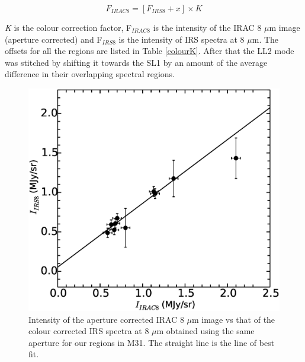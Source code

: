 \begin{equation}
F_{IRAC8} = [ F_{IRS8} + x ] \times K
\end{equation}
\footnotesize
\normalsize

	
	{\em K} is the colour correction factor, F$_{IRAC8}$ is the intensity of the IRAC 8 $\mu$m image (aperture corrected) and F$_{IRS8}$ is the intensity of IRS spectra at 8 $\mu$m. The offsets for all the regions are listed in Table \ref{colourK}. After that the LL2 mode was stitched by shifting it towards the SL1 by an amount of the average difference in their overlapping spectral regions.	
	
	
\begin{figure}
\centering
\includegraphics[scale=0.25]{./offset.eps}
\caption{ Intensity of the aperture corrected IRAC 8 $\mu$m image vs that of the colour corrected IRS spectra at 8 $\mu$m  obtained using the same aperture for our regions in M31. The straight line is the line of best fit. }
\label{offset}
\end{figure}



